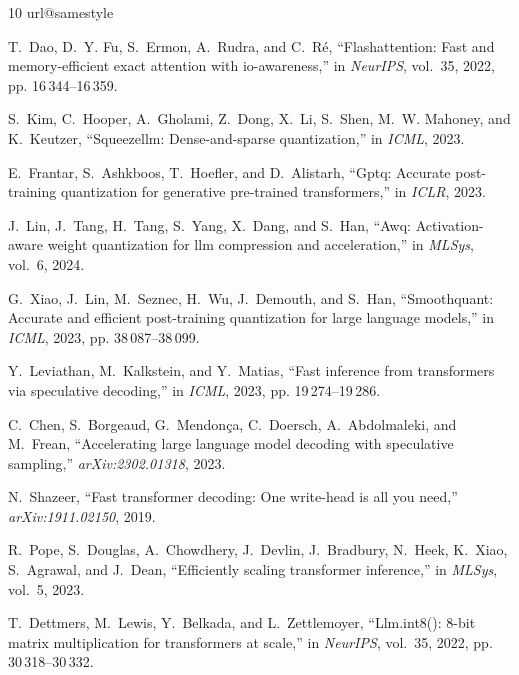 \documentclass[10pt,journal,compsoc,twocolumn]{IEEEtran}
\begin{document}
\balance


\begin{thebibliography}{10}
\providecommand{\url}[1]{#1}
\csname url@samestyle\endcsname
\providecommand{\newblock}{\relax}
\providecommand{\bibinfo}[2]{#2}
\providecommand{\BIBentrySTDinterwordspacing}{\spaceskip=0pt\relax}
\providecommand{\BIBentryALTinterwordstretchfactor}{4}
\providecommand{\BIBentryALTinterwordspacing}{\spaceskip=\fontdimen2\font plus
\BIBentryALTinterwordstretchfactor\fontdimen3\font minus
  \fontdimen4\font\relax}
\providecommand{\BIBforeignlanguage}[2]{{%
\expandafter\ifx\csname l@#1\endcsname\relax
\typeout{** WARNING: IEEEtran.bst: No hyphenation pattern has been}%
\typeout{** loaded for the language `#1'. Using the pattern for}%
\typeout{** the default language instead.}%
\else
\language=\csname l@#1\endcsname
\fi
#2}}
\providecommand{\BIBdecl}{\relax}
\BIBdecl

T.~Dao, D.~Y. Fu, S.~Ermon, A.~Rudra, and C.~R{\'e}, ``Flashattention: Fast and memory-efficient exact attention with io-awareness,'' in \emph{NeurIPS}, vol.~35, 2022, pp. 16\,344--16\,359.

S.~Kim, C.~Hooper, A.~Gholami, Z.~Dong, X.~Li, S.~Shen, M.~W. Mahoney, and K.~Keutzer, ``Squeezellm: Dense-and-sparse quantization,'' in \emph{ICML}, 2023.

E.~Frantar, S.~Ashkboos, T.~Hoefler, and D.~Alistarh, ``Gptq: Accurate post-training quantization for generative pre-trained transformers,'' in \emph{ICLR}, 2023.

J.~Lin, J.~Tang, H.~Tang, S.~Yang, X.~Dang, and S.~Han, ``Awq: Activation-aware weight quantization for llm compression and acceleration,'' in \emph{MLSys}, vol.~6, 2024.

G.~Xiao, J.~Lin, M.~Seznec, H.~Wu, J.~Demouth, and S.~Han, ``Smoothquant: Accurate and efficient post-training quantization for large language models,'' in \emph{ICML}, 2023, pp. 38\,087--38\,099.

Y.~Leviathan, M.~Kalkstein, and Y.~Matias, ``Fast inference from transformers via speculative decoding,'' in \emph{ICML}, 2023, pp. 19\,274--19\,286.

C.~Chen, S.~Borgeaud, G.~Mendon{\c{c}}a, C.~Doersch, A.~Abdolmaleki, and M.~Frean, ``Accelerating large language model decoding with speculative sampling,'' \emph{arXiv:2302.01318}, 2023.

N.~Shazeer, ``Fast transformer decoding: One write-head is all you need,'' \emph{arXiv:1911.02150}, 2019.

R.~Pope, S.~Douglas, A.~Chowdhery, J.~Devlin, J.~Bradbury, N.~Heek, K.~Xiao, S.~Agrawal, and J.~Dean, ``Efficiently scaling transformer inference,'' in \emph{MLSys}, vol.~5, 2023.

T.~Dettmers, M.~Lewis, Y.~Belkada, and L.~Zettlemoyer, ``Llm.int8(): 8-bit matrix multiplication for transformers at scale,'' in \emph{NeurIPS}, vol.~35, 2022, pp. 30\,318--30\,332.

\end{thebibliography}
\end{document}
